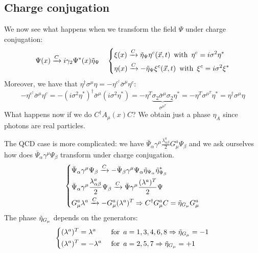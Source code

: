 \documentclass[../main.tex]{subfiles}
\begin{document}
\subsection{Charge conjugation}
We now see what happens when we transform the field $\Psi$ under charge conjugation:
\[
\Psi(x)\xrightarrow[]{C}i\gamma_2\Psi^*(x)\Tilde{\eta}_\Psi
\quad
\left\{
\begin{aligned}
&\xi(x)\xrightarrow[]{C}\Tilde{\eta}_\Psi\eta^c(\Vec{x},t) \,\text{ with }\, \eta^c=i\sigma^2\eta^*\\
&\eta(x)\xrightarrow[]{C}-\Tilde{\eta}_\Psi\xi^c(\Vec{x},t) \,\text{ with }\, \xi^c=i\sigma^2\xi^*
\end{aligned}
\right.
\]
Moreover, we have that $\eta^\dagger\sigma^\mu\eta=-\eta^c^\dagger\bar{\sigma}^\mu\eta^c$:
\[
-\eta^c^\dagger\bar{\sigma}^\mu\eta^c=-(i\sigma^2\eta^*)^\dagger\bar{\sigma}^\mu(i\sigma^2\eta^*)=-\eta^T\underbrace{\sigma_2\bar{\sigma}^\mu\sigma_2}_{\sigma^\mu^T}\eta^*=-\eta^T\sigma^\mu^T\eta^*=\eta^\dagger\sigma^\mu\eta
\]
What happens now if we do $C^\dagger A_\mu(x)C$? We obtain just a phase $\eta_A$ since photons are real particles.

The QCD case is more complicated: we have $\bar{\Psi}_\alpha\gamma^\mu\frac{\lambda^a_{\alpha\beta}}{2}G_\mu^a\Psi_\beta$ and we ask ourselves how does $\bar{\Psi}_\alpha\gamma^\mu\Psi_\beta$ transform under charge conjugation.
\[
\left\{
\begin{aligned}
&\bar{\Psi}_\alpha\gamma^\mu\Psi_\beta\xrightarrow[]{C}-\bar{\Psi}_\beta\gamma^\mu\Psi_\alpha\Tilde{\eta}_{\Psi_\alpha}\Tilde{\eta}^*_{\Psi_\beta}\\
&\bar{\Psi}_\alpha\gamma^\mu\frac{\lambda^a_{\alpha\beta}}{2}\Psi_\beta\xrightarrow[]{C}\bar{\Psi}\gamma^\mu\frac{(\lambda^a)^T}{2}\Psi\\
&G_\mu^a\lambda^a\xrightarrow[]{C}-G_\mu^a(\lambda^a)^T\Rightarrow C^\dagger G_\mu^a C=\Tilde{\eta}_{G_\mu}G_\mu^a
\end{aligned}
\right.
\]
The phase $\Tilde{\eta}_{G_\mu}$ depends on the generators:
\[
\left\{
\begin{aligned}
&(\lambda^a)^T=\lambda^a &&\text{ for } \, a=1,3,4,6,8\Rightarrow\Tilde{\eta}_{G_\mu}=-1\\
&(\lambda^a)^T=-\lambda^a &&\text{ for } \, a=2,5,7\Rightarrow\Tilde{\eta}_{G_\mu}=+1
\end{aligned}
\right.
\]
\end{document}
